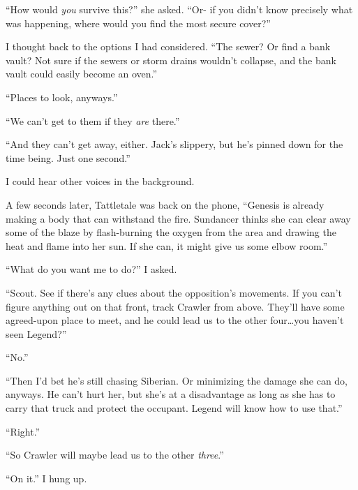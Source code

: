 ``How would \emph{you} survive this?'' she asked.  ``Or- if you didn't know precisely what was happening, where would you find the most secure cover?''



I thought back to the options I had considered.  ``The sewer?  Or find a bank vault?  Not sure if the sewers or storm drains wouldn't collapse, and the bank vault could easily become an oven.''



``Places to look, anyways.''



``We can't get to them if they \emph{are} there.''



``And they can't get away, either.  Jack's slippery, but he's pinned down for the time being.  Just one second.''



I could hear other voices in the background.



A few seconds later, Tattletale was back on the phone, ``Genesis is already making a body that can withstand the fire.  Sundancer thinks she can clear away some of the blaze by flash-burning the oxygen from the area and drawing the heat and flame into her sun.  If she can, it might give us some elbow room.''



``What do you want me to do?'' I asked.



``Scout.  See if there's any clues about the opposition's movements.  If you can't figure anything out on that front, track Crawler from above.  They'll have some agreed-upon place to meet, and he could lead us to the other four\ldots you haven't seen Legend?''



``No.''



``Then I'd bet he's still chasing Siberian.  Or minimizing the damage she can do, anyways. He can't hurt her, but she's at a disadvantage as long as she has to carry that truck and protect the occupant.  Legend will know how to use that.''



``Right.''



``So Crawler will maybe lead us to the other \emph{three}.''



``On it.''  I hung up.



